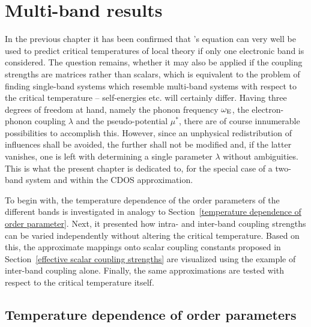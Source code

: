 
\chapter{Multi-band results}
\label{multi-band results}

In the previous chapter it has been confirmed that 's equation
can very well be used to predict critical temperatures of local
 theory if only one electronic band is considered. The question
remains, whether it may also be applied if the coupling strengths are matrices
rather than scalars, which is equivalent to the problem of finding single-band
systems which resemble multi-band systems with respect to the critical
temperature -- self-energies etc. will certainly differ. Having three degrees of
freedom at hand, namely the phonon frequency $\omega \sb{\text{E}}$, the
electron-phonon coupling $\lambda$ and the  pseudo-potential
$\mu^*$, there are of course innumerable possibilities to accomplish this.
However, since an unphysical redistribution of influences shall be avoided, the
further shall not be modified and, if the latter vanishes, one is left with
determining a single parameter $\lambda$ without ambiguities. This is what the
present chapter is dedicated to, for the special case of a two-band system and
within the CDOS approximation.

To begin with, the temperature dependence of the order parameters of the
different bands is investigated in analogy to Section~\ref{temperature
dependence of order parameter}. Next, it presented how intra- and inter-band
coupling strengths can be varied independently without altering the critical
temperature. Based on this, the approximate mappings onto scalar coupling
constants proposed in Section~\ref{effective scalar coupling strengths} are
visualized using the example of inter-band coupling alone. Finally, the same
approximations are tested with respect to the critical temperature itself.

\section{Temperature dependence of order parameters}
\label{temperature dependence of order parameters}

